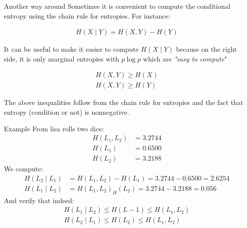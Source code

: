 \begin{parag}{Another way around}
    Sometimes it is convenient to compute the conditional entropy using the chain rule for entropies. For instance:
    \begin{formule}
        \begin{align*}
            H(X \mid  Y) = H(X, Y) - H(Y)
        \end{align*}
    \end{formule}
    It can be useful to make it easier to compute $H( X \mid  Y)$ because on the right side, it is only marginal entropies with $p \log p$ which are  \textit{"easy to compute}"
    \\
    \begin{corollaire}
        \begin{align*}
            H(X, Y) \geq H(X) \\
            H(X, Y) \geq H(Y)
        \end{align*}
    \end{corollaire}
    The above inequalities follow from the chain rule for entropies and the fact that entropy (condition or not) is nonnegative.
    
\end{parag}

\begin{parag}{Example}
    From lisa rolls two dice:
    \begin{align*}
        H(L_1, L_2) &= 3.2744 \\
        H(L_1) &= 0.6500 \\
        H(L_2) &= 3.2188
    \end{align*}
    We compute:
    \begin{align*}
        H(L_2 \mid  L_1) &= H(L_1, L_2) - H(L_1) = 3.2744 - 0.6500 = 2.6254 \\
        H(L_1 \mid  L_2) &= H(L_1, L_2) _ H(L_2) = 3.2744 - 3.2188 = 0.056
    \end{align*}
    And verify that indeed:
    \begin{align*}
        H(L_1 \mid  L_2) \leq H(L-1) \leq H(L_1, L_2) \\
        H(L_2 \mid  L_1) \leq H(L_2) \leq H(L_1, L_2)
    \end{align*}
    
    
    

\end{parag}


